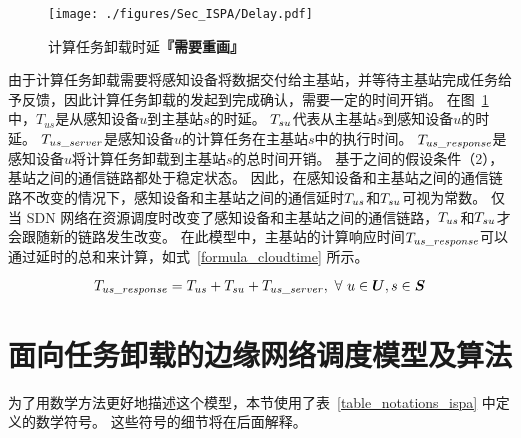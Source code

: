 \begin{figure}[!h]
  \centering
  \vspace{-1em}
  \texttt{[image: ./figures/Sec\_ISPA/Delay.pdf]}
  \vspace{-1em}
  \caption{计算任务卸载时延\textbf{『需要重画』}}
  \vspace{-1em}
  \label{fig_timestaps}
\end{figure}

由于计算任务卸载需要将感知设备将数据交付给主基站，并等待主基站完成任务给予反馈，因此计算任务卸载的发起到完成确认，需要一定的时间开销。
在图~\ref{fig_timestaps} 中，${T}_{us}$是从感知设备$u$到主基站$s$的时延。
${T}_{su}$代表从主基站$s$到感知设备$u$的时延。
${T}_{us\_server}$是感知设备$u$的计算任务在主基站$s$中的执行时间。
${T}_{us\_response}$是感知设备$u$将计算任务卸载到主基站$s$的总时间开销。
基于之间的假设条件（2），基站之间的通信链路都处于稳定状态。
因此，在感知设备和主基站之间的通信链路不改变的情况下，感知设备和主基站之间的通信延时${T}_{us}$和${T}_{su}$可视为常数。
仅当 SDN 网络在资源调度时改变了感知设备和主基站之间的通信链路，${T}_{us}$和${T}_{su}$才会跟随新的链路发生改变。
在此模型中，主基站的计算响应时间${T}_{us\_response}$可以通过延时的总和来计算，如式~\eqref{formula_cloudtime} 所示。


\begin{equation}
\label{formula_cloudtime}
{T}_{us\_response} = {T}_{us} + {T}_{su} + {T}_{us\_server},\ \forall \ u \in \boldsymbol{U}, s \in \boldsymbol{S}
\end{equation}

\section{面向任务卸载的边缘网络调度模型及算法}

为了用数学方法更好地描述这个模型，本节使用了表~\ref{table_notations_ispa} 中定义的数学符号。 这些符号的细节将在后面解释。

